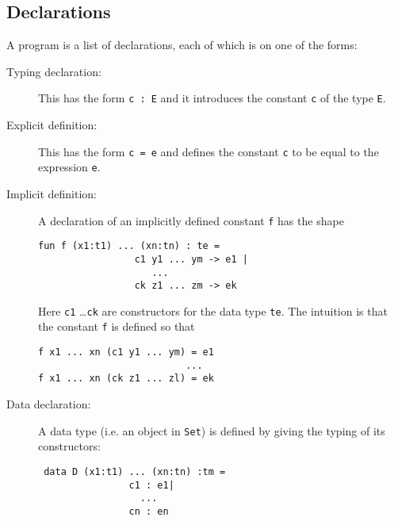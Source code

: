 \subsection{Declarations}
A program is a list of declarations, each of which is on one of the
forms:
\begin{description}
\item[Typing declaration:] This has the form \verb|c : E| and it
  introduces the constant \verb|c| of the type \verb|E|.
\item[Explicit definition:] This has the form \verb|c = e| and defines
  the constant \verb|c| to be equal to the expression \verb|e|.
\item[Implicit definition:] A declaration of an implicitly defined
  constant \verb|f| has the shape
\begin{verbatim}
fun f (x1:t1) ... (xn:tn) : te =
                 c1 y1 ... ym -> e1 |
                    ...
                 ck z1 ... zm -> ek
\end{verbatim}
Here \verb|c1| \dots \verb|ck| are constructors for the data type \verb|te|.
The intuition is that the constant \verb|f| is defined so that 
\begin{verbatim}
f x1 ... xn (c1 y1 ... ym) = e1
                          ...
f x1 ... xn (ck z1 ... zl) = ek
\end{verbatim}

\item[Data declaration:] A data type (i.e. an object in \verb|Set|) is
  defined by giving the typing of its constructors:
\begin{verbatim}
 data D (x1:t1) ... (xn:tn) :tm =
                c1 : e1| 
                  ... 
                cn : en
\end{verbatim}
\end{description}